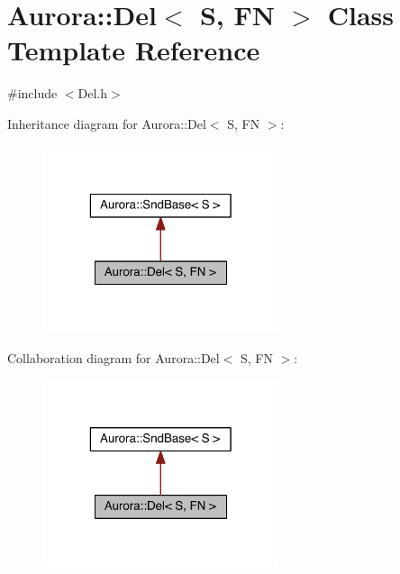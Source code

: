 \hypertarget{class_aurora_1_1_del}{}\section{Aurora\+:\+:Del$<$ S, FN $>$ Class Template Reference}
\label{class_aurora_1_1_del}


{\ttfamily \#include $<$Del.\+h$>$}



Inheritance diagram for Aurora\+:\+:Del$<$ S, FN $>$\+:\nopagebreak
\begin{figure}[H]
\begin{center}
\leavevmode
\includegraphics[width=196pt]{class_aurora_1_1_del__inherit__graph}
\end{center}
\end{figure}


Collaboration diagram for Aurora\+:\+:Del$<$ S, FN $>$\+:\nopagebreak
\begin{figure}[H]
\begin{center}
\leavevmode
\includegraphics[width=196pt]{class_aurora_1_1_del__coll__graph}
\end{center}
\end{figure}
